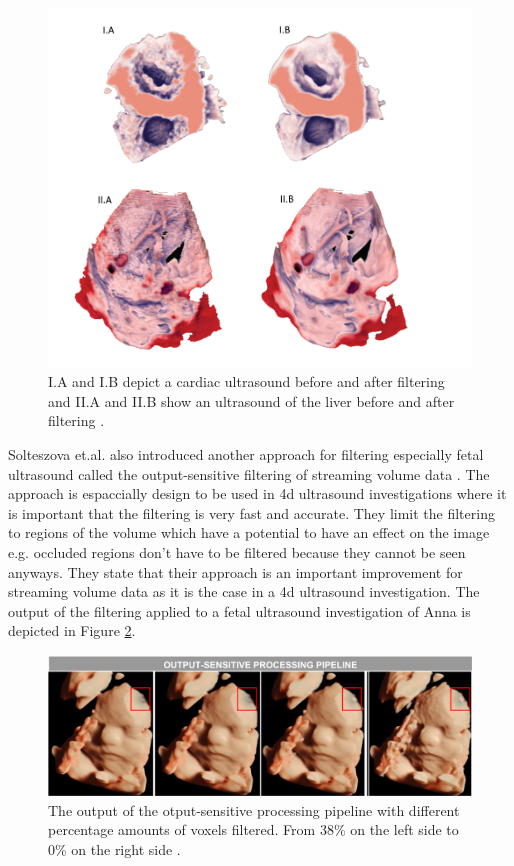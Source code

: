 \begin{figure} [htb!]
    \centering
	\includegraphics[width=16cm]{content/images/streamline}
	\caption{I.A and I.B depict a cardiac ultrasound before and after filtering and II.A and II.B show an ultrasound of the liver before and after filtering \cite{Solteszova2012}.}
	\label{fig:Streamline}
\end{figure}

\newpage
Solteszova et.al. also introduced another approach for filtering especially fetal ultrasound called the output-sensitive filtering of streaming volume data \cite{Solteszova2017}. The approach is espaccially design to be used in \gls{4d} ultrasound investigations where it is important that the filtering is very fast and accurate. They limit the filtering to regions of the volume which have a potential to have an effect on the image e.g. occluded regions don't have to be filtered because they cannot be seen anyways. They state that their approach is an important improvement for streaming volume data as it is the case in a \gls{4d} ultrasound investigation. The output of the filtering applied to a fetal ultrasound investigation of Anna is depicted in Figure \ref{fig:outputSensitive}.

\begin{figure} [htb!]
    \centering
	\includegraphics[width=16cm]{content/images/outputSensitive}
	\caption{The output of the otput-sensitive processing pipeline with different percentage amounts of voxels filtered. From 38\% on the left side to 0\% on the right side \cite{Solteszova2017}.}
	\label{fig:outputSensitive}
\end{figure}

